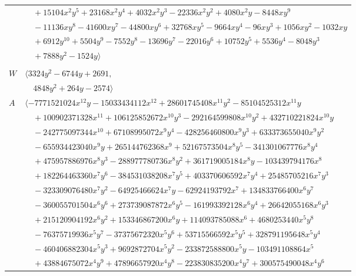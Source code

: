 \documentclass[11pt]{article}
\begin{document}
\begin{longtable}{@{}ll@{}}
 & $\quad +15104x^{2}y^{5}+23168x^{2}y^{4}+4032x^{2}y^{3}-22336x^{2}y^{2}+4080x^{2}y-8448xy^{9}$\\
 & $\quad -11136xy^{8}-41600xy^{7}-44800xy^{6}+32768xy^{5}-9664xy^{4}-96xy^{3}+1056xy^{2}-1032xy$\\
 & $\quad +6912y^{10}+5504y^{9}-7552y^{8}-13696y^{7}-22016y^{6}+10752y^{5}+5536y^{4}-8048y^{3}$\\
 & $\quad +7888y^{2}-1524y\rangle$\\
\addlinespace[2pt]
\multicolumn{2}{@{}p{0.97\textwidth}@{}}{$i=11$, $D_i=96$, $\rho_{ij}$: $2{:}1, \allowbreak 20{:}1, \allowbreak 21{:}2, \allowbreak 23{:}1, \allowbreak 27{:}2, \allowbreak 28{:}1, \allowbreak 32{:}1, \allowbreak 33{:}2, \allowbreak 34{:}1, \allowbreak 35{:}2, \allowbreak 38{:}1, \allowbreak 41{:}2$}\\
$W$ & $\langle 3324y^{2}-6744y+2691,$\\
 & $\quad 4848y^{2}+264y-2574\rangle$\\
$A$ & $\langle -7771521024x^{12}y-15033434112x^{12}+28601745408x^{11}y^{2}-85104525312x^{11}y$\\
 & $\quad +100902371328x^{11}+106125852672x^{10}y^{3}-292164599808x^{10}y^{2}+432710221824x^{10}y$\\
 & $\quad -242775097344x^{10}+67108995072x^{9}y^{4}-428256460800x^{9}y^{3}+633373655040x^{9}y^{2}$\\
 & $\quad -655934423040x^{9}y+265144762368x^{9}+52167573504x^{8}y^{5}-341301067776x^{8}y^{4}$\\
 & $\quad +475957886976x^{8}y^{3}-288977780736x^{8}y^{2}+361719005184x^{8}y-103439794176x^{8}$\\
 & $\quad +182264463360x^{7}y^{6}-384531038208x^{7}y^{5}+403370606592x^{7}y^{4}+25485705216x^{7}y^{3}$\\
 & $\quad -323309076480x^{7}y^{2}-64925466624x^{7}y-62924193792x^{7}+134833766400x^{6}y^{7}$\\
 & $\quad -360055701504x^{6}y^{6}+273739087872x^{6}y^{5}-161993392128x^{6}y^{4}+26642055168x^{6}y^{3}$\\
 & $\quad +215120904192x^{6}y^{2}+153346867200x^{6}y+114093785088x^{6}+4680253440x^{5}y^{8}$\\
 & $\quad -76375719936x^{5}y^{7}-37375672320x^{5}y^{6}+53715566592x^{5}y^{5}+328791195648x^{5}y^{4}$\\
 & $\quad -460406882304x^{5}y^{3}+9692872704x^{5}y^{2}-233872588800x^{5}y-103491108864x^{5}$\\
 & $\quad +43884675072x^{4}y^{9}+47896657920x^{4}y^{8}-223830835200x^{4}y^{7}+300575490048x^{4}y^{6}$\\

\end{longtable}
\end{document}
